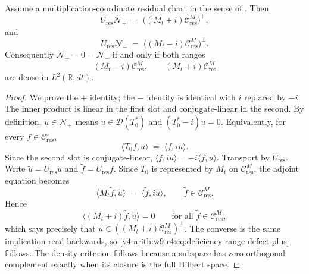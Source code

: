 \begin{theorem}
\label{v4-arith:w9-r4:thm:deficiency-range-defect}
\ClaimStatusProvedHereConditional Assume a multiplication-coordinate residual chart in
the sense of . Then
\begin{equation}
\label{v4-arith:w9-r4:eq:deficiency-range-defect-plus}
U_{\mathrm{res}}\mathcal{N}_{+}
\;=\;
\bigl((M_{t}+i)\mathcal{C}_{\mathrm{res}}^{M}\bigr)^{\perp},
\end{equation}
and
\begin{equation}
\label{v4-arith:w9-r4:eq:deficiency-range-defect-minus}
U_{\mathrm{res}}\mathcal{N}_{-}
\;=\;
\bigl((M_{t}-i)\mathcal{C}_{\mathrm{res}}^{M}\bigr)^{\perp}.
\end{equation}
Consequently \(\mathcal{N}_{+}=0=\mathcal{N}_{-}\) if and only if
both ranges
\[
(M_{t}-i)\mathcal{C}_{\mathrm{res}}^{M},
\qquad
(M_{t}+i)\mathcal{C}_{\mathrm{res}}^{M}
\]
are dense in \(L^{2}(\mathbb{R},dt)\).
\end{theorem}

\begin{proof}
We prove the \(+\) identity; the \(-\) identity is identical with
\(i\) replaced by \(-i\). The inner product is linear in the first
slot and conjugate-linear in the second. By definition,
\(u\in\mathcal{N}_{+}\) means \(u\in\mathcal{D}(T_{0}^{*})\) and
\((T_{0}^{*}-i)u=0\). Equivalently, for every
\(f\in\mathcal{C}_{\mathrm{res}}^{\circ}\),
\[
\langle T_{0}f,u\rangle
\;=\;
\langle f,iu\rangle .
\]
Since the second slot is conjugate-linear,
\(\langle f,iu\rangle=-i\langle f,u\rangle\).
Transport by \(U_{\mathrm{res}}\). Write
\(\tilde u=U_{\mathrm{res}}u\) and
\(\tilde f=U_{\mathrm{res}}f\). Since \(T_{0}\) is represented by
\(M_{t}\) on \(\mathcal{C}_{\mathrm{res}}^{M}\), the adjoint equation
becomes
\[
\langle M_{t}\tilde f,\tilde u\rangle
\;=\;
\langle \tilde f,i\tilde u\rangle ,
\qquad
\tilde f\in\mathcal{C}_{\mathrm{res}}^{M}.
\]
Hence
\[
\langle (M_{t}+i)\tilde f,\tilde u\rangle=0
\qquad
\text{for all }\tilde f\in\mathcal{C}_{\mathrm{res}}^{M},
\]
which says precisely that
\(\tilde u\in((M_{t}+i)\mathcal{C}_{\mathrm{res}}^{M})^{\perp}\).
The converse is the same implication read backwards, so
\eqref{v4-arith:w9-r4:eq:deficiency-range-defect-plus} follows.
The density criterion follows because a subspace has zero orthogonal
complement exactly when its closure is the full Hilbert space.
\end{proof}

